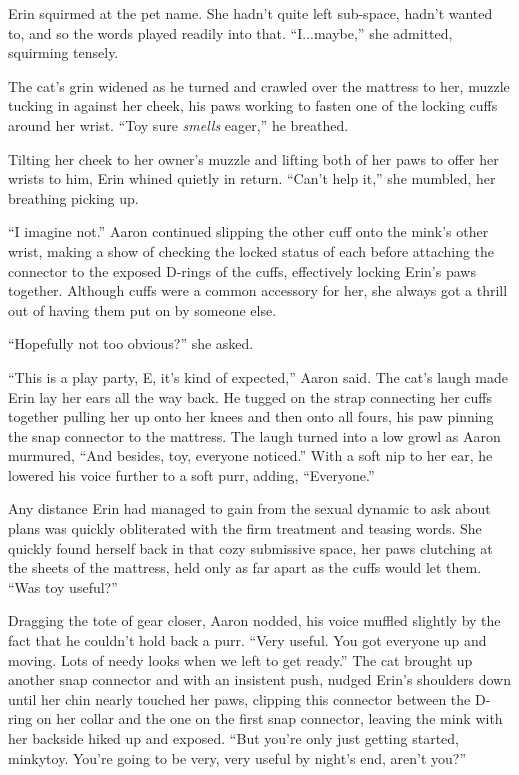 \documentclass[12pt,letterpaper,oneside]{memoir}
\begin{document}
  Erin squirmed at the pet name. She hadn't quite left sub-space, hadn't wanted to, and so the words played readily into that. ``I...maybe,'' she admitted, squirming tensely.

  The cat's grin widened as he turned and crawled over the mattress to her, muzzle tucking in against her cheek, his paws working to fasten one of the locking cuffs around her wrist. ``Toy sure \textit{smells} eager,'' he breathed.

  Tilting her cheek to her owner's muzzle and lifting both of her paws to offer her wrists to him, Erin whined quietly in return. ``Can't help it,'' she mumbled, her breathing picking up.

  ``I imagine not.'' Aaron continued slipping the other cuff onto the mink's other wrist, making a show of checking the locked status of each before attaching the connector to the exposed D-rings of the cuffs, effectively locking Erin's paws together. Although cuffs were a common accessory for her, she always got a thrill out of having them put on by someone else.

  ``Hopefully not too obvious?'' she asked.

  ``This is a play party, E, it's kind of expected,'' Aaron said. The cat's laugh made Erin lay her ears all the way back. He tugged on the strap connecting her cuffs together pulling her up onto her knees and then onto all fours, his paw pinning the snap connector to the mattress. The laugh turned into a low growl as Aaron murmured, ``And besides, toy, everyone noticed.'' With a soft nip to her ear, he lowered his voice further to a soft purr, adding, ``Everyone.''

  Any distance Erin had managed to gain from the sexual dynamic to ask about plans was quickly obliterated with the firm treatment and teasing words. She quickly found herself back in that cozy submissive space, her paws clutching at the sheets of the mattress, held only as far apart as the cuffs would let them. ``Was toy useful?''

  Dragging the tote of gear closer, Aaron nodded, his voice muffled slightly by the fact that he couldn't hold back a purr. ``Very useful. You got everyone up and moving. Lots of needy looks when we left to get ready.'' The cat brought up another snap connector and with an insistent push, nudged Erin's shoulders down until her chin nearly touched her paws, clipping this connector between the D-ring on her collar and the one on the first snap connector, leaving the mink with her backside hiked up and exposed. ``But you're only just getting started, minkytoy. You're going to be very, very useful by night's end, aren't you?''
\end{document}
